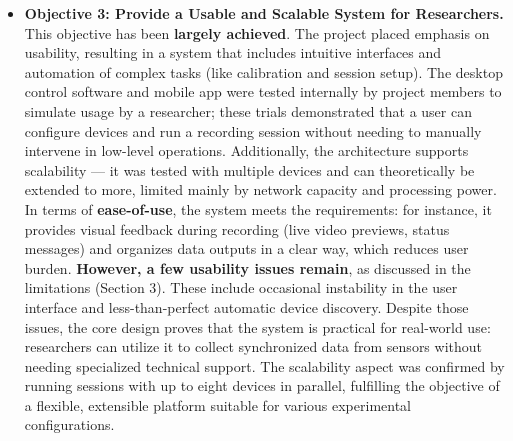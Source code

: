 \begin{itemize}
\item \textbf{Objective 3: Provide a Usable and Scalable System for Researchers.}
  This objective has been \textbf{largely achieved}. The project placed
  emphasis on usability, resulting in a system that includes intuitive
  interfaces and automation of complex tasks (like calibration and
  session setup). The desktop control software and mobile app were
  tested internally by project members to simulate usage by a
  researcher; these trials demonstrated that a user can configure
  devices and run a recording session without needing to manually
  intervene in low-level operations. Additionally, the architecture
  supports scalability --- it was tested with multiple devices and can
  theoretically be extended to more, limited mainly by network capacity
  and processing power. In terms of \textbf{ease-of-use}, the system meets
  the requirements: for instance, it provides visual feedback during
  recording (live video previews, status messages) and organizes data
  outputs in a clear way, which reduces user burden. \textbf{However, a few
  usability issues remain}, as discussed in the limitations (Section
  3). These include occasional instability in the user interface and
  less-than-perfect automatic device discovery. Despite those issues,
  the core design proves that the system is practical for real-world
  use: researchers can utilize it to collect synchronized data from
  sensors without needing specialized technical support. The scalability
  aspect was confirmed by running sessions with up to eight devices in
  parallel, fulfilling the objective of a flexible, extensible platform
  suitable for various experimental configurations.


\end{itemize}
